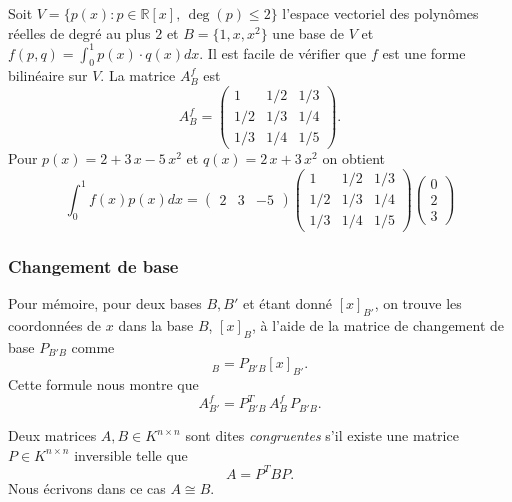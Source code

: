 \begin{example}
  \label{exe:9}
  Soit $V = \{ p(x) : p ∈ ℝ[x], \, \deg(p)≤ 2\}$ l'espace vectoriel des polynômes réelles de degré au plus $2$ et $B = \{ 1,x,x^2\}$ une base de $V$ et $f(p,q) = \int_0^1 p(x) ⋅ q(x) dx$. Il est facile de vérifier que $f$ est une forme bilinéaire sur $V$. La matrice $A_B^f$ est 
  \begin{displaymath}
    A_B^f =
    \begin{pmatrix}
      1 & 1/2 & 1/3 \\
      1/2 & 1/3 & 1/4\\
      1/3 & 1/4 & 1/5
    \end{pmatrix}. 
  \end{displaymath}
 Pour $p(x) = 2+3\,x - 5\,x^2$ et $q(x) = 2\,x + 3\,x^2$ on obtient 
 \begin{displaymath}
   \int_0^1 f(x) p(x) dx =
   \begin{pmatrix}
     2 & 3 & -5
   \end{pmatrix}
 \begin{pmatrix}
      1 & 1/2 & 1/3 \\
      1/2 & 1/3 & 1/4\\
      1/3 & 1/4 & 1/5
    \end{pmatrix}
   \begin{pmatrix}
     0\\2\\3
   \end{pmatrix}
 \end{displaymath}
\end{example}

\subsubsection{Changement de base}
\label{sec:changement-de-base}
Pour mémoire, pour deux bases $B,B'$ et étant donné $[x]_{B'}$,  on trouve les coordonnées de $x$ dans la base $B$,  $[x]_B$,  à l'aide de la matrice de changement de base $P_{B'B}$ comme 
\begin{displaymath}
  [x]_B = P_{B'B} [x]_{B'}. 
\end{displaymath}
Cette formule nous montre que 
\begin{equation}
\label{eq:28}
 A_{B'}^f =  P_{B'B}^T \,A_B^f \,  P_{B'B}. 
\end{equation}



\begin{definition}
  \label{def:13}
  Deux matrices $A,B \in K^{n\times n}$ sont dites \emph{congruentes} s'il existe une matrice $P \in K^{n \times n}$ inversible telle que 
\begin{displaymath}
  A = P^T B P.
\end{displaymath}
Nous écrivons dans ce cas $A \cong B$. 
\end{definition}


